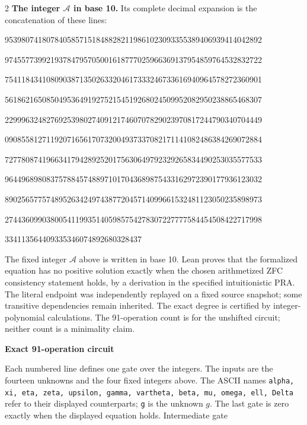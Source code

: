 \documentclass[10pt]{article}
\begin{document}
\begin{multicols}{2}
\textbf{The integer $\mathcal A$ in base 10.}
Its complete decimal expansion is the concatenation of these lines:\par
\begingroup\fontsize{7.7}{8.2}\selectfont{}\par
95398074180784058571518488282119861023093355389406939414042892\par
97455773992193784795705001618777025966369137954859764532832722\par
75411843410809038713502633204617333246733616940964578272360901\par
56186216508504953649192752154519268024509952082950238865468307\par
22999632482769253980274091217460707829023970817244790340704449\par
09085581271192071656170732004937337082171141082486384269072884\par
72778087419663417942892520175630649792329265834490253035577533\par
96449689808375788457488971017043689875433162972390177936123032\par
89025657757489526342497438772045714099661532481123050235898973\par
27443609903800541199351405985754278307227777584454508422717998\par
334113564409335346074892680328437\par
\endgroup
\normalfont\fontsize{7.7}{8.2}\selectfont
The fixed integer $\mathcal A$ above is written in base 10. Lean proves that
the formalized equation has no positive solution exactly when the chosen
arithmetized ZFC consistency statement holds, by a derivation in the specified
intuitionistic PRA. The literal endpoint was independently replayed on a fixed
source snapshot; some transitive dependencies remain inherited. The exact
degree is certified by integer-polynomial calculations. The 91-operation count
is for the unshifted circuit; neither count is a minimality claim.
\end{multicols}
\clearpage
\begin{center}{\large\bfseries Exact 91-operation circuit}\end{center}
Each numbered line defines one gate over the integers. The inputs are the
fourteen unknowns and the four fixed integers above. The ASCII names
\texttt{alpha, xi, eta, zeta, upsilon, gamma, vartheta, beta, mu, omega, ell, Delta}
refer to their displayed counterparts; \texttt{g} is the unknown $g$. The last
gate is zero exactly when the displayed equation holds. Intermediate gate
\end{document}
